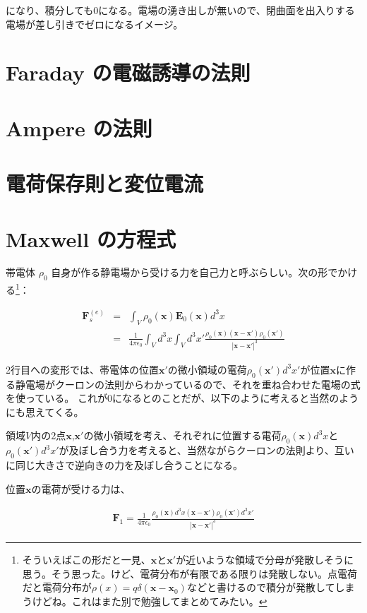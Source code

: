 \documentclass[a4j,12pt,uplatex,dvipdfmx]{jsreport}
\begin{document}
になり、積分しても$0$になる。電場の湧き出しが無いので、閉曲面を出入りする電場が差し引きでゼロになるイメージ。
\section{Faraday の電磁誘導の法則}

\section{Ampere の法則}

\section{電荷保存則と変位電流}

\section{Maxwell の方程式}

帯電体 $\rho_0$ 自身が作る静電場から受ける力を自己力と呼ぶらしい。次の形でかける\footnote{そういえばこの形だと一見、$\bm{x}$と$\bm{x'}$が近いような領域で分母が発散しそうに思う。そう思った。けど、電荷分布が有限である限りは発散しない。点電荷だと電荷分布が$\rho (x) = q \delta(\bm{x} - \bm{x}_0)$などと書けるので積分が発散してしまうけどね。これはまた別で勉強してまとめてみたい。}：

\begin{eqnarray*}
  \bm{F}^{(e)}_{s} &=& \int_{V} \rho_0(\bm{x}) \bm{E}_0(\bm{x}) d^3 x \\
  &=& \frac{1}{4 \pi \epsilon_0} \int_V d^3 x \int_V d^3 x' \frac{\rho_0(\bm{x}) (\bm{x} - \bm{x'}) \rho_0(\bm{x'})}{| \bm{x} - \bm{x'} |^3}
\end{eqnarray*}

2行目への変形では、帯電体の位置$\bm{x'}$の微小領域の電荷$\rho_0(\bm{x'}) d^3 x'$が位置$\bm{x}$に作る静電場がクーロンの法則からわかっているので、それを重ね合わせた電場の式を使っている。
これが$0$になるとのことだが、以下のように考えると当然のようにも思えてくる。

領域$V$内の2点$\bm{x}$,$\bm{x'}$の微小領域を考え、それぞれに位置する電荷$\rho_0(\bm{x})d^3x$と$\rho_0(\bm{x'})d^3x'$が及ぼし合う力を考えると、当然ながらクーロンの法則より、互いに同じ大きさで逆向きの力を及ぼし合うことになる。

位置$\bm{x}$の電荷が受ける力は、

\begin{eqnarray*}
  \bm{F}_1 = \frac{1}{4 \pi \epsilon_0}  \frac{\rho_0(\bm{x})d^3 x (\bm{x} - \bm{x'}) \rho_0(\bm{x'}) d^3 x'}{| \bm{x} - \bm{x'} |^3}
\end{eqnarray*}
\end{document}
